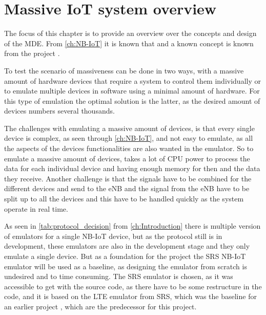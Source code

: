 \chapter{Massive IoT system overview}
\label{ch:MassOver}
The focus of this chapter is to provide an overview over the concepts and design of the \gls{MDE}. From \autoref{ch:NB-IoT} it is known that  and a known concept is known from the project \citep{thesis_report}.


To test the scenario of massiveness can be done in two ways, with a massive amount of hardware devices that require a system to control them individually or to emulate multiple devices in software using a minimal amount of hardware. For this type of emulation the optimal solution is the latter, as the desired amount of devices numbers several thousands. 

The challenges with emulating a massive amount of devices, is that every single device is complex, as seen through \autoref{ch:NB-IoT}, and not easy to emulate, as all the aspects of the devices functionalities are also wanted in the emulator. So to emulate a massive amount of devices, takes a lot of CPU power to process the data for each individual device and having enough memory for then and the data they receive. Another challenge is that the signals have to be combined for the different devices and send to the eNB and the signal from the eNB have to be split up to all the devices and this have to be handled quickly as the system operate in real time.

As seen in \autoref{tab:protocol_decision} from \autoref{ch:Introduction} there is multiple version of emulators for a single NB-IoT device, but as the protocol still is in development, these emulators are also in the development stage and they only emulate a single device. But as a foundation for the project the SRS NB-IoT emulator will be used as a baseline, as designing the emulator from scratch is undesired and to time consuming. The SRS emulator is chosen, as it was accessible to get with the source code, as there have to be some restructure in the code, and it is based on the LTE emulator from SRS, which was the baseline for an earlier project \citep{thesis_report}, which are the predecessor for this project.


